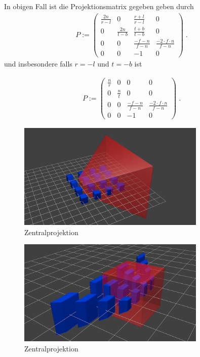 In obigen Fall ist die Projektionsmatrix gegeben  geben durch 
\begin{align*}
P := \begin{pmatrix}  
\frac{2n}{r-l}  &  0 &  \frac{r+l}{r-l}  & 0  \\
0   &  \frac{2n}{t-b} & \frac{t+b}{t-b} & 0  \\
0   &  0 & \frac{-f-n}{f-n} & \frac{-2\cdot f \cdot n}{f-n}  \\
0   &  0 & -1 & 0  
\end{pmatrix}  \; .
\end{align*} 
und insbesondere falls $r = -l$ und $t=-b$  ist

\begin{align*}
P := \begin{pmatrix}  
\frac{n}{r}  &  0 & 0  & 0  \\
0   &  \frac{n}{t} & 0 & 0  \\
0   &  0 & \frac{-f-n}{f-n} & \frac{-2\cdot f \cdot n}{f-n}  \\
0   &  0 & -1 & 0  
\end{pmatrix}  \; .
\end{align*} 




\begin{figure}[H]
    \centering
    \includegraphics[width=0.8\textwidth]{images/nondeforme.png}
    \caption{Zentralprojektion}
    \label{fig:projection-sight-vol}
\end{figure}

\begin{figure}[H]
    \centering
    \includegraphics[width=0.8\textwidth]{images/deform.png}
    \caption{Zentralprojektion}
    \label{fig:projection-sight-vol}
\end{figure}


